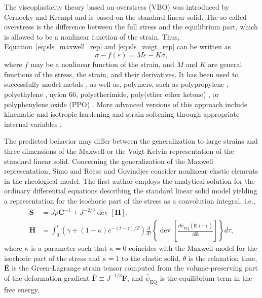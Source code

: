 The viscoplasticity theory based on overstress (VBO) was introduced by Cernocky and Krempl \citep{cernockyTheoryViscoplasticityBased1980} and is based on the standard linear-solid.
The so-called overstress is the difference between the full stress and the equilibrium part, which is allowed to be a nonlinear function of the strain.
Thus, Equation~\eqref{eq:sls_maxwell_rep} and \eqref{eq:sls_voigt_rep} can be written as
\begin{equation}
	\sigma - f(\varepsilon) = M\dot\varepsilon - K\dot \sigma,
\end{equation}
where $f$ may be a nonlinear function of the strain, and $M$ and $K$ are general functions of the stress, the strain, and their derivatives.
It has been used to successfully model metals \citep{liuUniaxialViscoplasticModel1979, yaoViscoplasticityTheoryBased1985}, as well as, polymers, such as polypropylene \citep{kitagawaRatedependentNonlinearConstitutive1989}, polyethylene \citep{kitagawaNonlinearConstitutiveEquation1990}, nylon 66, polyetherimide, poly(ether ether ketone) \citep{krempl2000overstress}, or polyphenylene oxide (PPO) \citep{colakModelingDeformationBehavior2005}.
More advanced versions of this approach include kinematic and isotropic hardening and strain softening through appropriate internal variables \citep{krempl2000overstress, hoExtensionViscoplasticityTheory2002}.

The predicted behavior may differ between the generalization to large strains and three dimensions of the Maxwell or the Voigt-Kelvin representation of the standard linear solid.
Concerning the generalization of the Maxwell representation, Simo \citep{simoFullyThreedimensionalFinitestrain1987} and Reese and Govindjee \citep{reeseTheoryFiniteViscoelasticity1998} consider nonlinear elastic elements in the rheological model.
The first author employs the analytical solution for the ordinary differential equations describing the standard linear solid model yielding a representation for the isochoric part of the stress as a convolution integral, i.e.,
\begin{align}
	\mathbf S &= Jp\mathbf C^{-1} + J^{-2/3}\operatorname{dev}[\mathbf H],\\
	\mathbf H &= \int_0^t (\gamma + (1-\kappa)e^{-(t-\tau)/T}) \frac{d}{d\tau}\left\{\operatorname{dev} \left[\frac{\partial {\bar\psi}_\text{EQ}(\bar{\mathbf E}(\tau))}{\partial \bar{\mathbf E}}\right]\right\}  d\tau,
\end{align}
where $\kappa$ is a parameter such that $\kappa=0$ coincides with the Maxwell model for the isochoric part of the stress and $\kappa=1$ to the elastic solid, $\theta$ is the relaxation time, $\bar{\bm E}$ is the Green-Lagrange strain tensor computed from the volume-preserving part of the deformation gradient $\bar{\bm F} \equiv J^{-1/3} \bm F$, and $\bar{\psi	}_\text{EQ}$ is the equilibrium term in the free energy.

